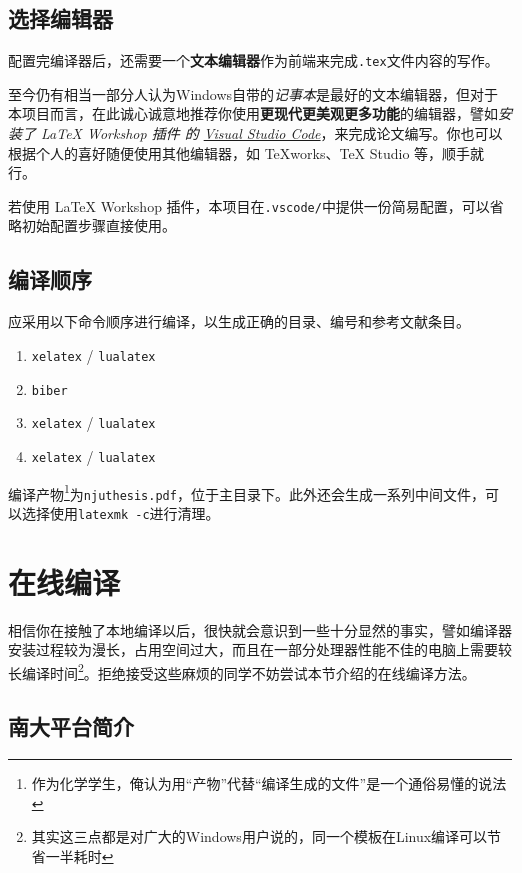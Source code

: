 \subsection{选择编辑器}

配置完编译器后，还需要一个\textbf{文本编辑器}作为前端来完成\texttt{.tex}文件内容的写作。

至今仍有相当一部分人认为Windows自带的\textit{记事本}是最好的文本编辑器，但对于本项目而言，在此诚心诚意地推荐你使用\textbf{更现代更美观更多功能}的编辑器，譬如\emph{安装了 LaTeX Workshop 插件 的 \href{https://code.visualstudio.com/}{Visual Studio Code}}，来完成论文编写。你也可以根据个人的喜好随便使用其他编辑器，如 TeXworks、TeX Studio 等，顺手就行。

若使用 LaTeX Workshop 插件，本项目在\lstinline|.vscode/|中提供一份简易配置，可以省略初始配置步骤直接使用。

\subsection{编译顺序}
应采用以下命令顺序进行编译，以生成正确的目录、编号和参考文献条目。
\begin{enumerate}
    \item \lstinline|xelatex| / \lstinline|lualatex|
    \item \lstinline|biber|
    \item \lstinline|xelatex| / \lstinline|lualatex|
    \item \lstinline|xelatex| / \lstinline|lualatex|
\end{enumerate}

编译产物\footnote{作为化学学生，俺认为用“产物”代替“编译生成的文件”是一个通俗易懂的说法}为\lstinline|njuthesis.pdf|，位于主目录下。此外还会生成一系列中间文件，可以选择使用\lstinline|latexmk -c|进行清理。

\section{在线编译}

相信你在接触了本地编译以后，很快就会意识到一些十分显然的事实，譬如编译器安装过程较为漫长，占用空间过大，而且在一部分处理器性能不佳的电脑上需要较长编译时间\footnote{其实这三点都是对广大的Windows用户说的，同一个模板在Linux编译可以节省一半耗时}。拒绝接受这些麻烦的同学不妨尝试本节介绍的在线编译方法。

\subsection{南大平台简介}

